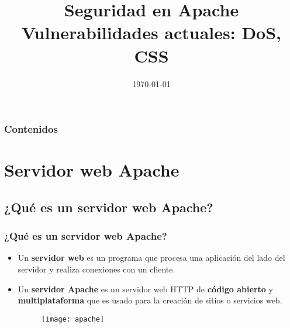 \documentclass{beamer}
\title[Seguridad en Apache]{Seguridad en Apache\\ Vulnerabilidades actuales: DoS, CSS} %
\author{} %
\institute[Universidad de Granada] %
{
  Universidad de Granada \\ %
  \medskip
}
\date{\today} %
\begin{document}
\thispagestyle{empty}
\begin{frame}
\titlepage %
\end{frame}

\thispagestyle{empty}
\begin{frame}
  \frametitle{Contenidos} %
  \tableofcontents
\end{frame}



\setcounter{framenumber}{0}


\section{Servidor web Apache} %

	\subsection{¿Qué es un servidor web Apache?} %
	\begin{frame}
	\frametitle{¿Qué es un servidor web Apache?}
	\begin{itemize}
		\item  Un \textbf{servidor web} es un programa que procesa una aplicación del lado del servidor y realiza conexiones con un cliente.
		\item Un \textbf{servidor Apache} es un servidor web HTTP de \textbf{código abierto} y \textbf{multiplataforma} que es usado para la creación de sitios o servicios web.
		\begin{figure}[H]
		\centering 
		\texttt{[image: apache]} 
		\vspace{-0.2cm} 
		\label{contexto:figura} 
		\end{figure}
	\end{itemize}
	\end{frame}
	
\end{document}
